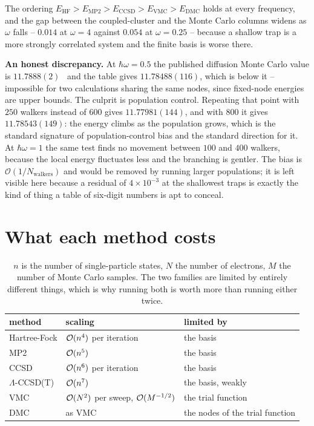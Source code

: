 The ordering
$E_{\mathrm{HF}}>E_{\mathrm{MP2}}>E_{\mathrm{CCSD}}>E_{\mathrm{VMC}}>
E_{\mathrm{DMC}}$ holds at every frequency, and the gap between the
coupled-cluster and the Monte Carlo columns widens as $\omega$ falls --
$0.014$ at $\omega=4$ against $0.054$ at $\omega=0.25$ -- because a shallow
trap is a more strongly correlated system and the finite basis is worse there.

\begin{notebox}
\textbf{An honest discrepancy.}  At $\hbar\omega=0.5$ the published diffusion
Monte Carlo value is $11.7888(2)$~\cite{lohne2011} and the table gives
$11.78488(116)$, which is below it -- impossible for two calculations sharing
the same nodes, since fixed-node energies are upper bounds.  The culprit is
population control.  Repeating that point with $250$ walkers instead of $600$
gives $11.77981(144)$, and with $800$ it gives $11.78543(149)$: the energy
climbs as the population grows, which is the standard signature of
population-control bias and the standard direction for it.  At $\hbar\omega=1$
the same test finds no movement between $100$ and $400$ walkers, because the
local energy fluctuates less and the branching is gentler.  The bias is
$\mathcal{O}(1/N_{\mathrm{walkers}})$ and would be removed by running larger
populations; it is left visible here because a residual of $4\times10^{-3}$ at
the shallowest traps is exactly the kind of thing a table of six-digit numbers
is apt to conceal.
\end{notebox}

\section{What each method costs}
\label{sec:appcost}

\begin{table}[h]
\centering
\renewcommand{\arraystretch}{1.25}
\setlength{\tabcolsep}{9pt}
\begin{tabular}{lll}
\toprule
method & scaling & limited by\\
\midrule
Hartree-Fock & $\mathcal{O}(n^4)$ per iteration & the basis\\
MP2 & $\mathcal{O}(n^5)$ & the basis\\
CCSD & $\mathcal{O}(n^6)$ per iteration & the basis\\
$\Lambda$-CCSD(T) & $\mathcal{O}(n^7)$ & the basis, weakly\\
\midrule
VMC & $\mathcal{O}(N^2)$ per sweep, $\mathcal{O}(M^{-1/2})$ & the trial function\\
DMC & as VMC & the nodes of the trial function\\
\bottomrule
\end{tabular}
\caption{$n$ is the number of single-particle states, $N$ the number of
electrons, $M$ the number of Monte Carlo samples.  The two families are limited
by entirely different things, which is why running both is worth more than
running either twice.}
\label{tab:16-cost}
\end{table}

